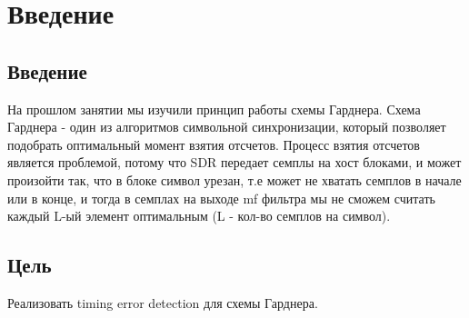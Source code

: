 \chapter{Введение}
\label{ch:intro}

\section{Введение} 

На прошлом занятии мы изучили принцип работы схемы Гарднера. Схема Гарднера - один из алгоритмов символьной синхронизации, который
позволяет подобрать оптимальный момент взятия отсчетов. Процесс взятия отсчетов является проблемой, потому что SDR передает семплы
на хост блоками, и может произойти так, что в блоке символ урезан, т.е может не хватать семплов в начале или в конце, и тогда в семплах
на выходе mf фильтра мы не сможем считать каждый L-ый элемент оптимальным (L - кол-во семплов на символ). 

\section{Цель} 

Реализовать timing error detection для схемы Гарднера.

\endinput